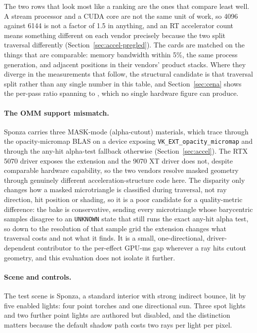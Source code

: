 The two rows that look most like a ranking are the ones that compare least well. A stream processor
and a CUDA core are not the same unit of work, so 4096 against 6144 is not a factor of 1.5 in
anything, and an RT accelerator count means something different on each vendor precisely because the
two split traversal differently (Section~\ref{sec:accel-pregled}). The cards are matched on the
things that are comparable: memory bandwidth within 5\%, the same process generation, and adjacent
positions in their vendors' product stacks. Where they diverge in the measurements that follow, the
structural candidate is that traversal split rather than any single number in this table, and
Section~\ref{sec:cena} shows the per-pass ratio spanning \perfRatioMin{} to \perfRatioMax{}, which no
single hardware figure can produce.

\paragraph{The OMM support mismatch.} Sponza carries three MASK-mode (alpha-cutout) materials, which
trace through the opacity-micromap BLAS on a device exposing \texttt{VK\_EXT\_opacity\_micromap} and
through the any-hit alpha-test fallback otherwise (Section~\ref{sec:accel}). The RTX 5070 driver
exposes the extension and the 9070 XT driver does not, despite comparable hardware capability, so the
two vendors resolve masked geometry through genuinely different acceleration-structure code here. The
disparity only changes how a masked microtriangle is classified during traversal, not ray direction,
hit position or shading, so it is a poor candidate for a quality-metric difference: the bake is
conservative, sending every microtriangle whose barycentric samples disagree to an \texttt{UNKNOWN}
state that still runs the exact any-hit alpha test, so down to the resolution of that sample grid the
extension changes what traversal costs and not what it finds. It is a small,
one-directional, driver-dependent contributor to the per-effect GPU-ms gap wherever a ray hits cutout
geometry, and this evaluation does not isolate it further.

\paragraph{Scene and controls.} The test scene is Sponza, a standard interior with strong indirect
bounce, lit by five enabled lights: four point torches and one directional sun. Three spot lights and
two further point lights are authored but disabled, and the distinction matters because the default
shadow path costs two rays per light per pixel.

